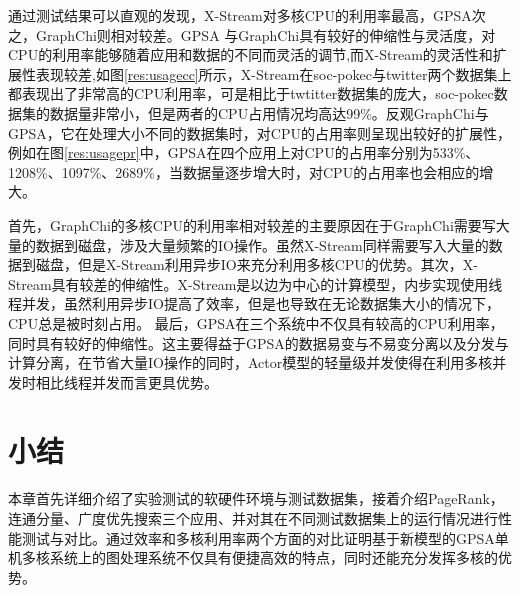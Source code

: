通过测试结果可以直观的发现，X-Stream对多核CPU的利用率最高，GPSA次之，GraphChi则相对较差。GPSA
与GraphChi具有较好的伸缩性与灵活度，对CPU的利用率能够随着应用和数据的不同而灵活的调节,而X-Stream的灵活性和扩展性表现较差,如图\ref{res:usagecc}所示，X-Stream在soc-pokec与twitter两个数据集上都表现出了非常高的CPU利用率，可是相比于twtitter数据集的庞大，soc-pokec数据集的数据量非常小，但是两者的CPU占用情况均高达99\%。反观GraphChi与GPSA，它在处理大小不同的数据集时，对CPU的占用率则呈现出较好的扩展性，例如在图\ref{res:usagepr}中，GPSA在四个应用上对CPU的占用率分别为533\%、1208\%、1097\%、2689\%，当数据量逐步增大时，对CPU的占用率也会相应的增大。

首先，GraphChi的多核CPU的利用率相对较差的主要原因在于GraphChi需要写大量的数据到磁盘，涉及大量频繁的IO操作。虽然X-Stream同样需要写入大量的数据到磁盘，但是X-Stream利用异步IO来充分利用多核CPU的优势。其次，X-Stream具有较差的伸缩性。X-Stream是以边为中心的计算模型，内步实现使用线程并发，虽然利用异步IO提高了效率，但是也导致在无论数据集大小的情况下，CPU总是被时刻占用。
最后，GPSA在三个系统中不仅具有较高的CPU利用率，同时具有较好的伸缩性。这主要得益于GPSA的数据易变与不易变分离以及分发与计算分离，在节省大量IO操作的同时，Actor模型的轻量级并发使得在利用多核并发时相比线程并发而言更具优势。







\section{小结}

本章首先详细介绍了实验测试的软硬件环境与测试数据集，接着介绍PageRank，连通分量、广度优先搜索三个应用、并对其在不同测试数据集上的运行情况进行性能测试与对比。通过效率和多核利用率两个方面的对比证明基于新模型的GPSA单机多核系统上的图处理系统不仅具有便捷高效的特点，同时还能充分发挥多核的优势。





